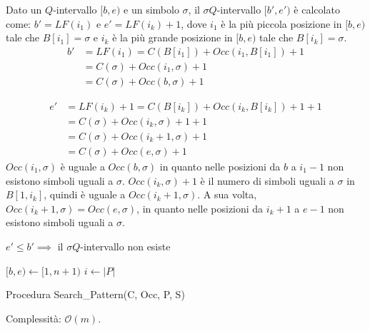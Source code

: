 Dato un $Q$-intervallo $[b,e)$ e un simbolo $\sigma$, il $\sigma Q$-intervallo $[b',e')$ è calcolato come: $b' = LF(i_1)$ e $e' = LF(i_k) +1$, dove $i_1$ è la più piccola posizione in $[b,e)$ tale che $B[i_1] = \sigma$ e $i_k$ è la più grande posizione in $[b,e)$ tale che $B[i_k] = \sigma$.\\
\begin{equation*}
    \begin{split}
        b' & = LF(i_1) = C(B[i_1]) + Occ(i_1, B[i_1]) +1 \\
        & = C(\sigma) + Occ(i_1, \sigma) +1 \\ 
        & = C(\sigma) + Occ(b, \sigma) +1
    \end{split}
\end{equation*}

\begin{equation*}
    \begin{split}
        e'& = LF(i_k) +1 = C(B[i_k]) + Occ(i_k, B[i_k]) +1 +1 \\ 
        & = C(\sigma) + Occ(i_k, \sigma) +1 +1 \\ 
        & = C(\sigma) + Occ(i_k +1, \sigma) +1 \\
        & = C(\sigma) + Occ(e, \sigma) +1
    \end{split}
\end{equation*}
$Occ(i_1, \sigma)$ è uguale a $Occ(b, \sigma)$ in quanto nelle posizioni da $b$ a $i_1-1$ non esistono simboli uguali a $\sigma$.
$Occ(i_k, \sigma) +1$ è il numero di simboli uguali a $\sigma$ in $B[1, i_k]$, quindi è uguale a $Occ(i_k+1, \sigma)$.
A sua volta, $Occ(i_k+1, \sigma) = Occ(e, \sigma)$, in quanto nelle posizioni da $i_k+1$ a $e-1$ non esistono simboli uguali a $\sigma$.

$e' \leq b' \implies $ il $\sigma Q$-intervallo non esiste

\begin{algorithm}[H]
    \SetAlgoLined
    $[b,e) \leftarrow [1, n+1)$\;
    $i \leftarrow |P|$\;
    \While{$[b,e)$ is not null $\land i > 0$}{
        $\sigma \leftarrow P[i]$\;
        $b \leftarrow C(\sigma) + Occ(b, \sigma) + 1$\;
        $e \leftarrow C(\sigma) + Occ(e, \sigma) + 1$\;
        $i \leftarrow i-1$\;
    }
    \If{$[b,e)$ is not null}{
        output $S[b,e)$
    }
    \caption{Procedura Search\_Pattern(C, Occ, P, S)}
\end{algorithm}
Complessità: $\mathcal{O}(m)$.